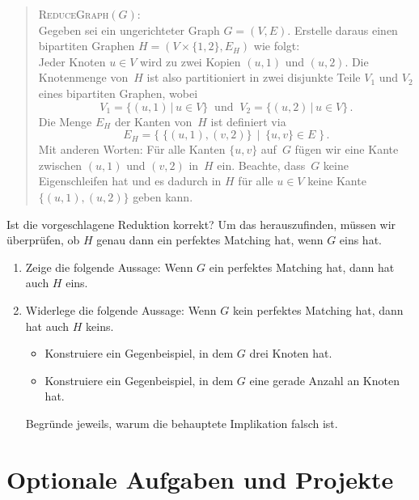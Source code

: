 \documentclass{uebung_cs}
\begin{document}
\begin{exercise}
	\begin{quote}
		\textsc{ReduceGraph}$(G)$:\\
		Gegeben sei ein ungerichteter Graph $G = (V,E)$. Erstelle daraus einen bipartiten Graphen $H = (V \times \{1,2\},E_H)$ wie folgt:\\
		Jeder Knoten $u \in V$ wird zu zwei Kopien $(u,1)$ und $(u,2)$. Die Knotenmenge von~$H$ ist also partitioniert in zwei disjunkte Teile $V_1$ und $V_2$ eines bipartiten Graphen, wobei
		\begin{equation*}
			V_1 = \{(u,1)\,|\,u\in V\}\ \text{ und }\ V_2 = \{(u,2)\,|\,u\in V\}\,.
		\end{equation*}
		Die Menge $E_H$ der Kanten von~$H$ ist definiert via
		\[E_H = \Big\{\;\{(u,1),(v,2)\}\,\;\Big|\;\,\{u,v\} \in E\;\Big\}\,.\]
		Mit anderen Worten: Für alle Kanten $\{u,v\}$ auf~$G$ fügen wir eine Kante zwischen $(u,1)$ und $(v,2)$ in~$H$ ein. Beachte, dass~$G$ keine Eigenschleifen hat und es dadurch in $H$ für alle $u \in V$ keine Kante  $\{(u,1),(u,2)\}$ geben kann.
	\end{quote}
	Ist die vorgeschlagene Reduktion korrekt? Um das herauszufinden, müssen wir überprüfen, ob $H$ genau dann ein perfektes Matching hat, wenn $G$ eins hat.
	\begin{enumerate}[resume]
		\item\medium Zeige die folgende Aussage: Wenn $G$ ein perfektes Matching hat, dann hat auch $H$ eins.
		\item\medium Widerlege die folgende Aussage: Wenn $G$ kein perfektes Matching hat, dann hat auch $H$ keins.
		      \begin{itemize}
			      \item Konstruiere ein Gegenbeispiel, in dem $G$ drei Knoten hat. 
			      \item Konstruiere ein Gegenbeispiel, in dem $G$ eine gerade Anzahl an Knoten hat.
		      \end{itemize}
			  Begründe jeweils, warum die behauptete Implikation falsch ist.
	\end{enumerate}
\end{exercise}

\clearpage
\section*{Optionale Aufgaben und Projekte}
\end{document}
